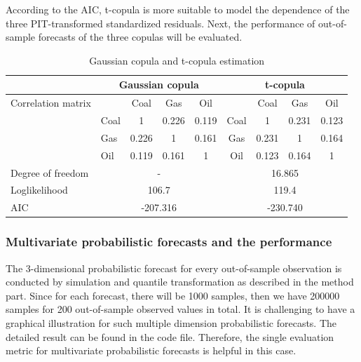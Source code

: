 \documentclass[12pt,a4paper]{article}
\numberwithin{equation}{section}
\begin{document}
According to the AIC, t-copula is more suitable to model the dependence of the three PIT-transformed standardized residuals. Next, the performance of out-of-sample forecasts of the three copulas will be evaluated.

\begin{table}[h!]
\centering
\caption{Gaussian copula and t-copula estimation } \label{copula}
\begin{tabular}{l|lccc|cccc|}
\cline{2-9}
 & \multicolumn{4}{c|}{Gaussian copula} & \multicolumn{4}{c|}{t-copula} \\ \hline
\multicolumn{1}{|l|}{Correlation matrix} & \multicolumn{1}{l|}{} & Coal & Gas & Oil & \multicolumn{1}{c|}{} & Coal & Gas & Oil \\ \cline{2-9} 
\multicolumn{1}{|l|}{} & \multicolumn{1}{l|}{Coal} & 1 & 0.226 & 0.119 & \multicolumn{1}{c|}{Coal} & 1 & 0.231 & 0.123 \\
\multicolumn{1}{|l|}{} & \multicolumn{1}{l|}{Gas} & 0.226 & 1 & 0.161 & \multicolumn{1}{c|}{Gas} & 0.231 & 1 & 0.164 \\
\multicolumn{1}{|l|}{} & \multicolumn{1}{l|}{Oil} & 0.119 & 0.161 & 1 & \multicolumn{1}{c|}{Oil} & 0.123 & 0.164 & 1 \\ \hline
\multicolumn{1}{|l|}{Degree of freedom} & \multicolumn{4}{c|}{-} & \multicolumn{4}{c|}{16.865} \\ \hline
\multicolumn{1}{|l|}{Loglikelihood} & \multicolumn{4}{c|}{106.7} & \multicolumn{4}{c|}{119.4} \\ \hline
\multicolumn{1}{|l|}{AIC} & \multicolumn{4}{c|}{-207.316} & \multicolumn{4}{c|}{-230.740} \\ \hline
\end{tabular}
\end{table}

\subsubsection{Multivariate probabilistic forecasts and the performance}
The 3-dimensional probabilistic forecast for every out-of-sample observation is conducted by simulation and quantile transformation as described in the method part. Since for each forecast, there will be 1000 samples, then we have 200000 samples for 200 out-of-sample observed values in total. It is challenging to have a graphical illustration for such multiple dimension probabilistic forecasts. The detailed result can be found in the code file. Therefore, the single evaluation metric for multivariate probabilistic forecasts is helpful in this case. 
\end{document}
